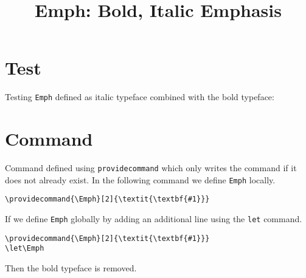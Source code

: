 \documentclass{article}
\title{Emph: Bold, Italic Emphasis}
\date{}
\providecommand{\Emph}[2]{\textit{\textbf{#1}}}
\begin{document}
\maketitle

\section*{Test}

Testing \texttt{Emph} defined as italic typeface combined with the bold typeface: 




\section*{Command}

Command defined using \texttt{providecommand} which only writes the command if it does not already exist. In the following command we define \texttt{Emph} locally. 

\begin{framed}
\begin{verbatim}
\providecommand{\Emph}[2]{\textit{\textbf{#1}}}
\end{verbatim}
\end{framed}


If we define \texttt{Emph} globally by adding an additional line using the \texttt{let} command. 

\begin{framed}
\begin{verbatim}
\providecommand{\Emph}[2]{\textit{\textbf{#1}}}
\let\Emph
\end{verbatim}
\end{framed}

Then the bold typeface is removed. 
\end{document}
